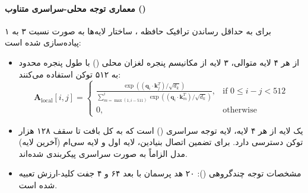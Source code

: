 \paragraph*{معماری توجه محلی-سراسری متناوب ()}
برای به حداقل رساندن ترافیک حافظه ، ساختار لایه‌ها به صورت نسبت ۳ به ۱ پیاده‌سازی شده است:
\begin{itemize}
    \item از هر ۴ لایه متوالی، ۳ لایه از مکانیسم پنجره لغزان محلی () با طول پنجره محدود به ۵۱۲ توکن استفاده می‌کنند:
    \begin{equation}
        \mathbf{A}_{\text{local}}[i, j] = \begin{cases} 
            \frac{\exp\left( (\mathbf{q}_i \cdot \mathbf{k}_j^T)/\sqrt{d_k} \right)}{\sum_{m = \max(1, i-511)}^i \exp\left( (\mathbf{q}_i \cdot \mathbf{k}_m^T)/\sqrt{d_k} \right)}, & \text{if } 0 \le i - j < 512 \\
            0, & \text{otherwise}
        \end{cases}
    \end{equation}
    \item یک لایه از هر ۴ لایه، لایه توجه سراسری () است که به کل بافت تا سقف ۱۲۸ هزار توکن دسترسی دارد. برای تضمین اتصال بنیادین، لایه اول و لایه سی‌ام (آخرین لایه) مدل الزاماً به صورت سراسری پیکربندی شده‌اند.
    \item مشخصات توجه چندگروهی (): ۲۰ هد پرسمان با بعد ۶۴ و ۴ جفت کلید-ارزش تعبیه شده است.
\end{itemize}

